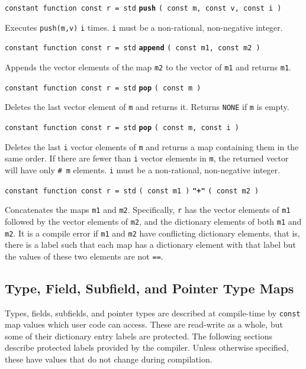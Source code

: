 \documentclass[12pt]{article}
\newcommand{\ttkey}[1]{{\tt \bfseries #1}}
\newenvironment{indpar}[1][0.3in]%
	{\begin{list}{}%
		     {\setlength{\itemsep}{0in}%
		      \setlength{\topsep}{0in}%
		      \setlength{\parsep}{1ex}%
		      \setlength{\labelwidth}{#1}%
		      \setlength{\leftmargin}{#1}%
		      \addtolength{\leftmargin}{\labelsep}}%
	 \item}%
	{\end{list}}
\begin{document}
{\tt constant function const r = std} \ttkey{push}
    {\tt ( const m, const v, const i )}
\begin{indpar}
Executes {\tt push(m,v)} {\tt i} times.  {\tt i} must be a
non-rational, non-negative integer.
\end{indpar}

{\tt constant function const r = std} \ttkey{append}
    {\tt ( const m1, const m2 )}
\begin{indpar}
Appends the vector elements of the map {\tt m2} to the vector of {\tt m1}
and returns {\tt m1}.
\end{indpar}

{\tt constant function const r = std} \ttkey{pop} {\tt ( const m )}
\begin{indpar}
Deletes the last vector element of {\tt m} and returns it.
Returns {\tt NONE} if {\tt m} is empty.
\end{indpar}

{\tt constant function const r = std} \ttkey{pop} {\tt ( const m, const i )}
\begin{indpar}
Deletes the last {\tt i} vector elements of {\tt m} and returns a map
containing them in the same order.
If there are fewer than {\tt i} vector elements
in {\tt m}, the returned vector will have only {\tt \# m} elements.
{\tt i} must be a non-rational, non-negative integer.
\end{indpar}

{\tt constant function const r = std}
	{\tt ( const m1 )} \ttkey{"+"} {\tt ( const m2 )}
\begin{indpar}
Concatenates the maps {\tt m1} and {\tt m2}.  Specifically,
{\tt r} has the vector elements of {\tt m1} followed by the
vector elements of {\tt m2}, and the dictionary elements
of both {\tt m1} and {\tt m2}.  It is a compile error if
{\tt m1} and {\tt m2} have conflicting dictionary elements,
that is, there is a label such that each map has a dictionary
element with that label but the values of these two elements
are not {\tt ==}.
\end{indpar}

\subsection{Type, Field, Subfield, and Pointer Type Maps}
\label{TYPE-FIELD-SUBFIELD-MAPS}

Types, fields, subfields, and pointer types are described
at compile-time by {\tt const} map values which
user code can access.
These are read-write as a whole, but some of their dictionary entry
labels are protected.  The following sections describe protected labels
provided by the compiler.  Unless otherwise specified,
these have values that do not change during compilation.
\end{document}
